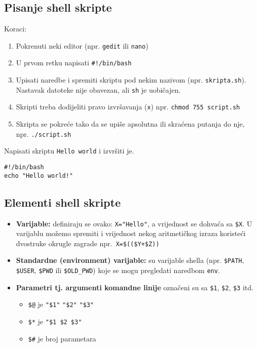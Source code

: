 \subsection*{Pisanje shell skripte}
Koraci:
\begin{enumerate}
\item Pokrenuti neki editor (npr. \texttt{gedit} ili \texttt{nano})
\item U prvom retku napisati \lstinline!#!\texttt{!/bin/bash}
\item Upisati naredbe i spremiti skriptu pod nekim nazivom (npr. \texttt{skripta.sh}). Nastavak datoteke nije obavezan, ali \texttt{sh} je uobičajen.
\item Skripti treba dodijeliti pravo izvršavanja (\texttt{x}) npr. \lstinline!chmod 755 script.sh!
\item Skripta se pokreće tako da se upiše apsolutna ili skraćena putanja do nje, npr. \texttt{./script.sh}
\end{enumerate}

\begin{zadatak}Napisati skriptu \texttt{Hello world} i izvršiti je.
\begin{lstlisting}
#!/bin/bash 
echo "Hello world!"
\end{lstlisting}
\end{zadatak}
\subsection*{Elementi shell skripte}
\begin{itemize}
 \item \textbf{Varijable: } definiraju se ovako: \lstinline!X="Hello"!, a vrijednost se dohvaća sa \lstinline!$X!. U varijablu možemo spremiti i vrijednost nekog aritmetičkog izraza koristeći dvostruke okrugle zagrade npr.~\lstinline!X=$(($Y+$Z))!
\item \textbf{Standardne (environment) varijable: } su varijable shella (npr. \lstinline!$PATH!, \lstinline!$USER!, \lstinline!$PWD! ili \lstinline!$OLD_PWD!) koje se mogu pregledati naredbom \texttt{env}.
\item \textbf{Parametri tj. argumenti komandne linije} označeni su sa \lstinline!$1!, \lstinline!$2!, \lstinline!$3! itd.
\begin{itemize}
 \item \lstinline!$@! je \lstinline!"$1"! \lstinline!"$2"! \lstinline!"$3"!
\item \lstinline!$*! je \lstinline!"$1 $2 $3"!
\item \lstinline!$#! je broj parametara
\end{itemize}

\end{itemize}

